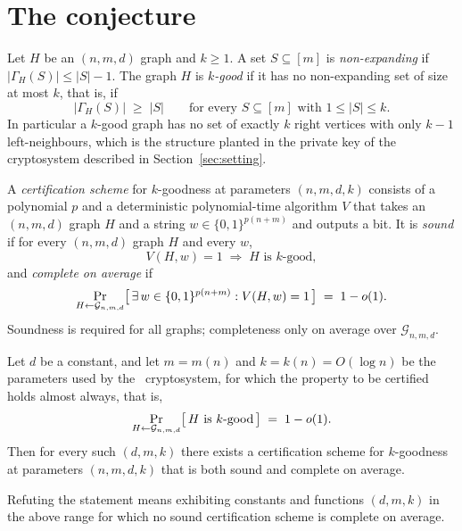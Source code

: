 \documentclass{aicr-conjecture}
\newcommand{\bits}{\{0,1\}}
\newcommand{\Gnmd}{\mathcal{G}_{n,m,d}}
\newcommand{\Nbr}{\Gamma_H}
\begin{document}
\section{The conjecture}\label{sec:conjectures}

\begin{definition}\label{def:kgood}
Let $H$ be an $(n,m,d)$ graph and $k \ge 1$. A set $S \subseteq [m]$ is
\emph{non-expanding} if $|\Nbr(S)| \le |S| - 1$. The graph $H$ is
\emph{$k$-good} if it has no non-expanding set of size at most $k$,
that is, if
\[
  |\Nbr(S)| \;\ge\; |S| \qquad \text{for every } S \subseteq [m]
  \text{ with } 1 \le |S| \le k .
\]
In particular a $k$-good graph has no set of exactly $k$ right vertices
with only $k-1$ left-neighbours, which is the structure planted in the
private key of the cryptosystem described in
Section~\ref{sec:setting}.
\end{definition}

\begin{definition}\label{def:cert}
A \emph{certification scheme} for $k$-goodness at parameters
$(n,m,d,k)$ consists of a polynomial $p$ and a deterministic
polynomial-time algorithm $V$ that takes an $(n,m,d)$ graph $H$ and a
string $w \in \bits^{p(n+m)}$ and outputs a bit. It is \emph{sound} if
for every $(n,m,d)$ graph $H$ and every $w$,
\[
  V(H,w) = 1 \;\Longrightarrow\; H \text{ is } k\text{-good},
\]
and \emph{complete on average} if
\[
  \Pr_{H \sample \Gnmd}
  \bigl[\, \exists\, w \in \bits^{p(n+m)} : V(H,w) = 1 \,\bigr]
  \;=\; 1 - o(1).
\]
Soundness is required for all graphs; completeness only on average over
$\Gnmd$.
\end{definition}

\begin{conjecture}\label{conj:main}
Let $d$ be a constant, and let $m = m(n)$ and $k = k(n) = O(\log n)$ be
the parameters used by the~\cite{ABW10} cryptosystem, for which the
property to be certified holds almost always, that is,
\[
  \Pr_{H \sample \Gnmd}
  \bigl[\, H \text{ is } k\text{-good} \,\bigr] \;=\; 1 - o(1).
\]
Then for every such $(d,m,k)$ there exists a certification scheme for
$k$-goodness at parameters $(n,m,d,k)$ that is both sound and complete
on average.

Refuting the statement means exhibiting constants and functions
$(d,m,k)$ in the above range for which no sound certification scheme is
complete on average.
\end{conjecture}
\end{document}
